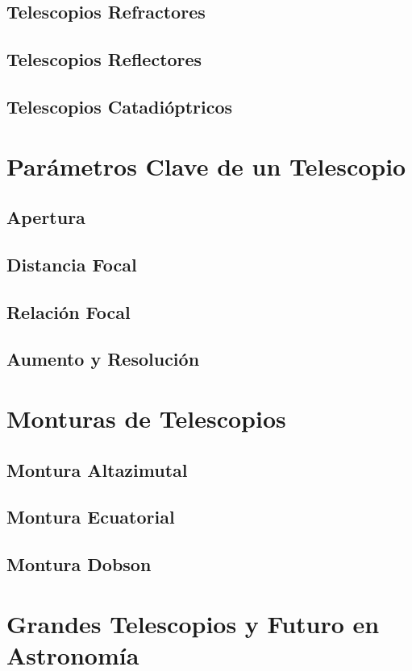 \subsection{Telescopios Refractores}

\subsection{Telescopios Reflectores}

\subsection{Telescopios Catadióptricos}

\section{Parámetros Clave de un Telescopio}

\subsection{Apertura}
\subsection{Distancia Focal}
\subsection{Relación Focal}
\subsection{Aumento y Resolución}

\section{Monturas de Telescopios}
\subsection{Montura Altazimutal}
\subsection{Montura Ecuatorial}
\subsection{Montura Dobson}

\section{Grandes Telescopios y Futuro en Astronomía}

